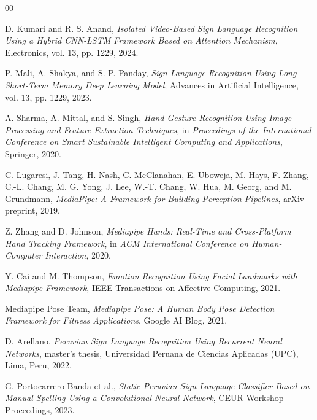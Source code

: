 \documentclass[preprint,12pt,authoryear]{elsarticle}
\begin{document}
\newpage

\begin{thebibliography}{00} %

D. Kumari and R. S. Anand, 
\textit{Isolated Video-Based Sign Language Recognition Using a Hybrid CNN-LSTM Framework Based on Attention Mechanism}, 
Electronics, vol. 13, pp. 1229, 2024. 

P. Mali, A. Shakya, and S. P. Panday, 
\textit{Sign Language Recognition Using Long Short-Term Memory Deep Learning Model}, 
Advances in Artificial Intelligence, vol. 13, pp. 1229, 2023. 

A. Sharma, A. Mittal, and S. Singh, 
\textit{Hand Gesture Recognition Using Image Processing and Feature Extraction Techniques}, 
in \textit{Proceedings of the International Conference on Smart Sustainable Intelligent Computing and Applications}, 
Springer, 2020.

C. Lugaresi, J. Tang, H. Nash, C. McClanahan, E. Uboweja, M. Hays, F. Zhang, C.-L. Chang, M. G. Yong, J. Lee, W.-T. Chang, W. Hua, M. Georg, and M. Grundmann, 
\textit{MediaPipe: A Framework for Building Perception Pipelines}, 
arXiv preprint, 2019. 

Z. Zhang and D. Johnson, 
\textit{Mediapipe Hands: Real-Time and Cross-Platform Hand Tracking Framework}, 
in \textit{ACM International Conference on Human-Computer Interaction}, 2020.

Y. Cai and M. Thompson, 
\textit{Emotion Recognition Using Facial Landmarks with Mediapipe Framework}, 
IEEE Transactions on Affective Computing, 2021.

Mediapipe Pose Team, 
\textit{Mediapipe Pose: A Human Body Pose Detection Framework for Fitness Applications}, 
Google AI Blog, 2021.

D. Arellano, 
\textit{Peruvian Sign Language Recognition Using Recurrent Neural Networks}, 
master's thesis, Universidad Peruana de Ciencias Aplicadas (UPC), Lima, Peru, 2022.

G. Portocarrero-Banda et al., 
\textit{Static Peruvian Sign Language Classifier Based on Manual Spelling Using a Convolutional Neural Network}, 
CEUR Workshop Proceedings, 2023.


\end{thebibliography}
\end{document}
